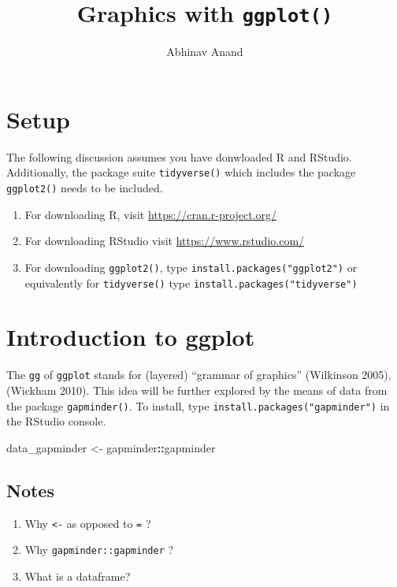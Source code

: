 \documentclass[]{article}
\title{Graphics with \texttt{ggplot()}}
\author{Abhinav Anand}
\date{}
\newenvironment{Shaded}{\begin{snugshade}}{\end{snugshade}}
\newcommand{\StringTok}[1]{\textcolor[rgb]{0.31,0.60,0.02}{#1}}
\newcommand{\OperatorTok}[1]{\textcolor[rgb]{0.81,0.36,0.00}{\textbf{#1}}}
\newcommand{\NormalTok}[1]{#1}
\providecommand{\tightlist}{%
  \setlength{\itemsep}{0pt}\setlength{\parskip}{0pt}}
\begin{document}
\maketitle

\section{Setup}\label{setup}

The following discussion assumes you have donwloaded R and RStudio.
Additionally, the package suite \texttt{tidyverse()} which includes the
package \texttt{ggplot2()} needs to be included.

\begin{enumerate}
\def\labelenumi{\arabic{enumi}.}
\tightlist
\item
  For downloading R, visit \url{https://cran.r-project.org/}
\item
  For downloading RStudio visit \url{https://www.rstudio.com/}
\item
  For downloading \texttt{ggplot2()}, type
  \texttt{install.packages("ggplot2")} or equivalently for
  \texttt{tidyverse()} type \texttt{install.packages("tidyverse")}
\end{enumerate}

\section{Introduction to ggplot}\label{introduction-to-ggplot}

The \texttt{gg} of \texttt{ggplot} stands for (layered) ``grammar of
graphics'' (Wilkinson 2005), (Wickham 2010). This idea will be further
explored by the means of data from the package \texttt{gapminder()}. To
install, type \texttt{install.packages("gapminder")} in the RStudio
console.

\begin{Shaded}
\begin{Highlighting}[]
\NormalTok{data_gapminder <-}\StringTok{ }\NormalTok{gapminder}\OperatorTok{::}\NormalTok{gapminder }
\end{Highlighting}
\end{Shaded}

\subsection{Notes}\label{notes}

\begin{enumerate}
\def\labelenumi{\arabic{enumi}.}
\item
  Why \texttt{\textless{}-} as opposed to \texttt{=} ?
\item
  Why \texttt{gapminder::gapminder} ?
\item
  What is a dataframe?
\end{enumerate}
\end{document}
